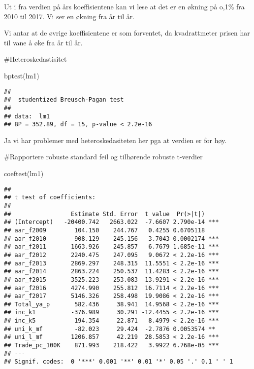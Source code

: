 \documentclass[
]{article}
\newenvironment{Shaded}{\begin{snugshade}}{\end{snugshade}}
\newcommand{\FunctionTok}[1]{\textcolor[rgb]{0.00,0.00,0.00}{#1}}
\newcommand{\NormalTok}[1]{#1}
\begin{document}
Ut i fra verdien på års koeffisientene kan vi lese at det er en økning
på o,1\% fra 2010 til 2017. Vi ser en økning fra år til år.

Vi antar at de øvrige koeffisientene er som forventet, da kvadrattmeter
prisen har til vane å øke fra år til år.

\#Heteroskedastisitet

\begin{Shaded}
\begin{Highlighting}[]
\FunctionTok{bptest}\NormalTok{(lm1)}
\end{Highlighting}
\end{Shaded}

\begin{verbatim}
## 
##  studentized Breusch-Pagan test
## 
## data:  lm1
## BP = 352.89, df = 15, p-value < 2.2e-16
\end{verbatim}

Ja vi har problemer med heteroskedasiteten her pga at verdien er for
høy.

\#Rapportere robuste standard feil og tilhørende robuste t-verdier

\begin{Shaded}
\begin{Highlighting}[]
\FunctionTok{coeftest}\NormalTok{(lm1)}
\end{Highlighting}
\end{Shaded}

\begin{verbatim}
## 
## t test of coefficients:
## 
##                 Estimate Std. Error  t value  Pr(>|t|)    
## (Intercept)   -20400.742   2663.022  -7.6607 2.790e-14 ***
## aar_f2009        104.150    244.767   0.4255 0.6705118    
## aar_f2010        908.129    245.156   3.7043 0.0002174 ***
## aar_f2011       1663.926    245.857   6.7679 1.685e-11 ***
## aar_f2012       2240.475    247.095   9.0672 < 2.2e-16 ***
## aar_f2013       2869.297    248.315  11.5551 < 2.2e-16 ***
## aar_f2014       2863.224    250.537  11.4283 < 2.2e-16 ***
## aar_f2015       3525.223    253.083  13.9291 < 2.2e-16 ***
## aar_f2016       4274.990    255.812  16.7114 < 2.2e-16 ***
## aar_f2017       5146.326    258.498  19.9086 < 2.2e-16 ***
## Total_ya_p       582.436     38.941  14.9568 < 2.2e-16 ***
## inc_k1          -376.989     30.291 -12.4455 < 2.2e-16 ***
## inc_k5           194.354     22.871   8.4979 < 2.2e-16 ***
## uni_k_mf         -82.023     29.424  -2.7876 0.0053574 ** 
## uni_l_mf        1206.857     42.219  28.5853 < 2.2e-16 ***
## Trade_pc_100K    871.993    218.422   3.9922 6.768e-05 ***
## ---
## Signif. codes:  0 '***' 0.001 '**' 0.01 '*' 0.05 '.' 0.1 ' ' 1
\end{verbatim}
\end{document}
